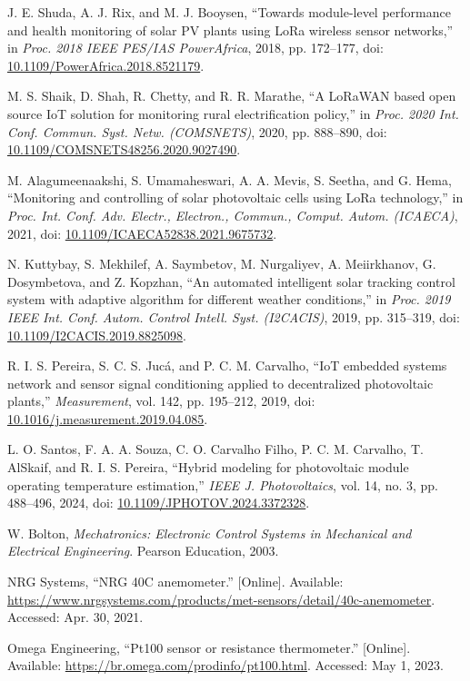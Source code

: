 \documentclass{ieeeaccess}
\begin{document}
\begin{thebibliography}{00}
J. E. Shuda, A. J. Rix, and M. J. Booysen, “Towards module-level performance and health monitoring of solar PV plants using LoRa wireless sensor networks,” in \emph{Proc. 2018 IEEE PES/IAS PowerAfrica}, 2018, pp. 172–177, doi: \url{10.1109/PowerAfrica.2018.8521179}.

M. S. Shaik, D. Shah, R. Chetty, and R. R. Marathe, “A LoRaWAN based open source IoT solution for monitoring rural electrification policy,” in \emph{Proc. 2020 Int. Conf. Commun. Syst. Netw. (COMSNETS)}, 2020, pp. 888–890, doi: \url{10.1109/COMSNETS48256.2020.9027490}.

M. Alagumeenaakshi, S. Umamaheswari, A. A. Mevis, S. Seetha, and G. Hema, “Monitoring and controlling of solar photovoltaic cells using LoRa technology,” in \emph{Proc. Int. Conf. Adv. Electr., Electron., Commun., Comput. Autom. (ICAECA)}, 2021, doi: \url{10.1109/ICAECA52838.2021.9675732}.


N. Kuttybay, S. Mekhilef, A. Saymbetov, M. Nurgaliyev, A. Meiirkhanov, G. Dosymbetova, and Z. Kopzhan, “An automated intelligent solar tracking control system with adaptive algorithm for different weather conditions,” in \emph{Proc. 2019 IEEE Int. Conf. Autom. Control Intell. Syst. (I2CACIS)}, 2019, pp. 315–319, doi: \url{10.1109/I2CACIS.2019.8825098}.

R. I. S. Pereira, S. C. S. Jucá, and P. C. M. Carvalho, “IoT embedded systems network and sensor signal conditioning applied to decentralized photovoltaic plants,” \emph{Measurement}, vol. 142, pp. 195–212, 2019, doi: \url{10.1016/j.measurement.2019.04.085}.

L. O. Santos, F. A. A. Souza, C. O. Carvalho Filho, P. C. M. Carvalho, T. AlSkaif, and R. I. S. Pereira, “Hybrid modeling for photovoltaic module operating temperature estimation,” \emph{IEEE J. Photovoltaics}, vol. 14, no. 3, pp. 488–496, 2024, doi: \url{10.1109/JPHOTOV.2024.3372328}.

W. Bolton, \emph{Mechatronics: Electronic Control Systems in Mechanical and Electrical Engineering}. Pearson Education, 2003.

NRG Systems, “NRG 40C anemometer.” [Online]. Available: \url{https://www.nrgsystems.com/products/met-sensors/detail/40c-anemometer}. Accessed: Apr. 30, 2021.

Omega Engineering, “Pt100 sensor or resistance thermometer.” [Online]. Available: \url{https://br.omega.com/prodinfo/pt100.html}. Accessed: May 1, 2023.


\end{thebibliography}
\end{document}
